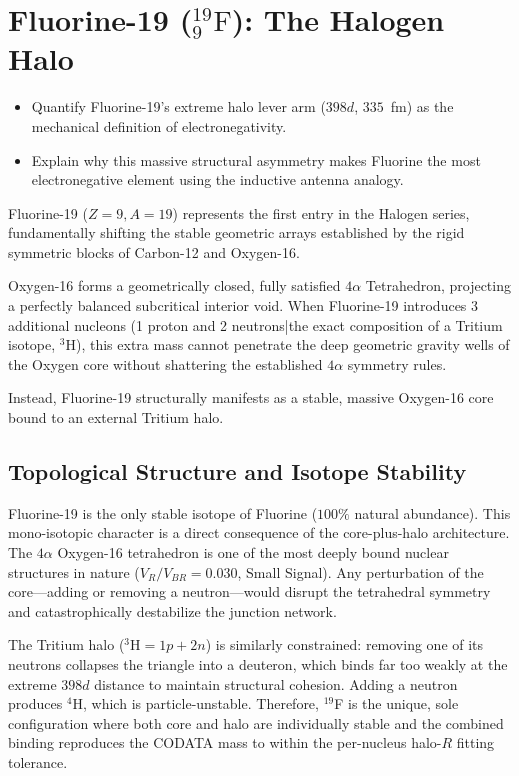 \chapter{Fluorine-19 ($^{19}_{9}\text{F}$): The Halogen Halo}
\label{ch:fluorine}

\begin{objectivebox}
\begin{itemize}
    \item Quantify Fluorine-19's extreme halo lever arm ($398d$, $335$~fm) as the mechanical definition of electronegativity.
    \item Explain why this massive structural asymmetry makes Fluorine the most electronegative element using the inductive antenna analogy.
\end{itemize}
\end{objectivebox}

Fluorine-19 ($Z=9, A=19$) represents the first entry in the Halogen series, fundamentally shifting the stable geometric arrays established by the rigid symmetric blocks of Carbon-12 and Oxygen-16.

Oxygen-16 forms a geometrically closed, fully satisfied $4\alpha$ Tetrahedron, projecting a perfectly balanced subcritical interior void. When Fluorine-19 introduces 3 additional nucleons (1 proton and 2 neutrons|the exact composition of a Tritium isotope, $^3\text{H}$), this extra mass cannot penetrate the deep geometric gravity wells of the Oxygen core without shattering the established $4\alpha$ symmetry rules.

Instead, Fluorine-19 structurally manifests as a stable, massive Oxygen-16 core bound to an external Tritium halo.

\section{Topological Structure and Isotope Stability}
Fluorine-19 is the only stable isotope of Fluorine ($100\%$ natural abundance). This mono-isotopic character is a direct consequence of the core-plus-halo architecture. The $4\alpha$ Oxygen-16 tetrahedron is one of the most deeply bound nuclear structures in nature ($V_R/V_{BR} = 0.030$, Small Signal). Any perturbation of the core---adding or removing a neutron---would disrupt the tetrahedral symmetry and catastrophically destabilize the junction network.

The Tritium halo ($^3\text{H} = 1p + 2n$) is similarly constrained: removing one of its neutrons collapses the triangle into a deuteron, which binds far too weakly at the extreme $398d$ distance to maintain structural cohesion. Adding a neutron produces $^4\text{H}$, which is particle-unstable. Therefore, $^{19}$F is the unique, sole configuration where both core and halo are individually stable and the combined binding reproduces the CODATA mass to within the per-nucleus halo-$R$ fitting tolerance.


